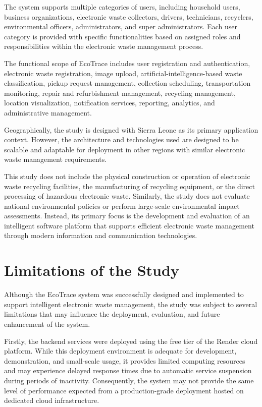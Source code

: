The system supports multiple categories of users, including household users,
business organizations, electronic waste collectors, drivers, technicians, recyclers,
environmental officers, administrators, and super administrators. Each user category
is provided with specific functionalities based on assigned roles and responsibilities
within the electronic waste management process.

The functional scope of EcoTrace includes user registration and authentication,
electronic waste registration, image upload, artificial-intelligence-based waste
classification, pickup request management, collection scheduling, transportation
monitoring, repair and refurbishment management, recycling management, location
visualization, notification services, reporting, analytics, and administrative
management.

Geographically, the study is designed with Sierra Leone as its primary
application context. However, the architecture and technologies used are designed to
be scalable and adaptable for deployment in other regions with similar electronic
waste management requirements.

This study does not include the physical construction or operation of electronic
waste recycling facilities, the manufacturing of recycling equipment, or the direct
processing of hazardous electronic waste. Similarly, the study does not evaluate
national environmental policies or perform large-scale environmental impact
assessments. Instead, its primary focus is the development and evaluation of an
intelligent software platform that supports efficient electronic waste management
through modern information and communication technologies.

\section{Limitations of the Study}
\label{sec:limitations-intro}

Although the EcoTrace system was successfully designed and implemented to
support intelligent electronic waste management, the study was subject to several
limitations that may influence the deployment, evaluation, and future enhancement of
the system.

Firstly, the backend services were deployed using the free tier of the Render
cloud platform. While this deployment environment is adequate for development,
demonstration, and small-scale usage, it provides limited computing resources and
may experience delayed response times due to automatic service suspension during
periods of inactivity. Consequently, the system may not provide the same level of
performance expected from a production-grade deployment hosted on dedicated
cloud infrastructure.

